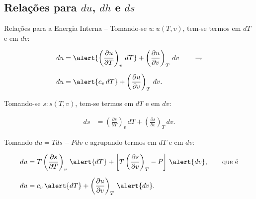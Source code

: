 \subsection{Relações para $du$, $dh$ e $ds$}

    \begin{frame}[allowframebreaks]{Relações para a Energia Interna --}\vspace*{-0em}
        Tomando-se \alert{$u\!:\!u(T, v)$}, tem-se termos em \alert{$dT$} e em \alert{$dv$}:

        \begin{align*}
            du  &= 
                \alert{\left(\frac{\partial u}{\partial T}\right)_v\,dT} +
                \left(\frac{\partial u}{\partial v}\right)_T\,dv
            \qquad\rightharpoondown
            \\[\medskipamount]
            du  &=
                \alert{c_v\,dT} +
                \left(\frac{\partial u}{\partial v}\right)_T\,dv.
        \end{align*}

        Tomando-se \alert{$s\!:\!s(T, v)$}, tem-se termos em \alert{$dT$} e em \alert{$dv$}:

        \begin{align*}
            ds  &= 
                \left(\frac{\partial s}{\partial T}\right)_v\,dT +
                \left(\frac{\partial s}{\partial v}\right)_T\,dv.
        \end{align*}

        Tomando \alert{$du = Tds - Pdv$} e agrupando termos em \alert{$dT$} e em \alert{$dv$}:

        \begin{align*}
            du  &=
                T\left(\frac{\partial s}{\partial T}\right)_v\,\alert{dT} +
                \left[
                    T\left(\frac{\partial s}{\partial v}\right)_T - P
                \right]\,\alert{dv},
            \qquad\mbox{que é}
            \\[\medskipamount]
            du  &=
                c_v\,\alert{dT} +
                \left(\frac{\partial u}{\partial v}\right)_T\,\alert{dv}.
        \end{align*}


\end{frame}
